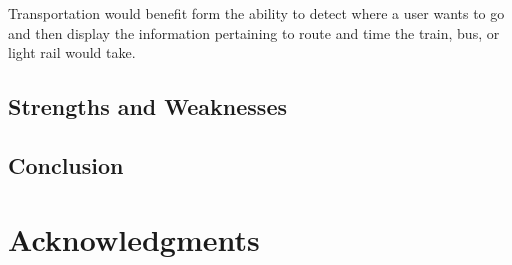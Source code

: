 \documentclass{sig-alternate}
\begin{document}
Transportation would benefit form the ability to detect where a user wants to go and then display the information pertaining to route and time the train, bus, or light rail would take.

\subsection{Strengths and Weaknesses}
\label{Strengths and Weaknesses}


\subsection{Conclusion}
\label{Conclusion}

\section{Acknowledgments}
\label{sec:Acknowledgments}



\end{document}

